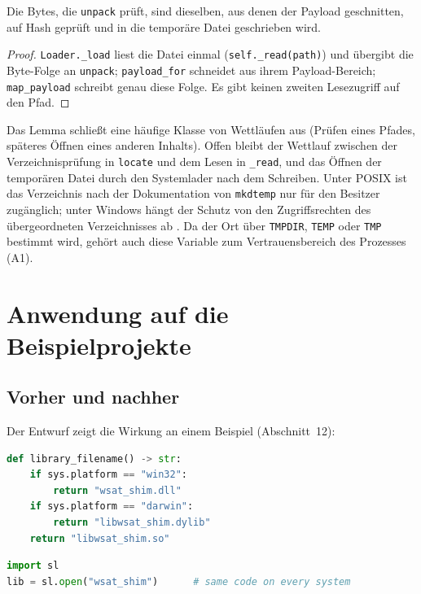 \begin{lemma}
	\label{lem:einmal}
	Die Bytes, die \texttt{unpack} prüft, sind dieselben, aus denen der Payload geschnitten, auf Hash geprüft und in die temporäre Datei geschrieben wird.
\end{lemma}

\begin{proof}
	\texttt{Loader.\_load} liest die Datei einmal (\texttt{self.\_read(path)}) und übergibt die Byte-Folge an \texttt{unpack}; \texttt{payload\_for} schneidet aus ihrem Payload-Bereich; \texttt{map\_payload} schreibt genau diese Folge. Es gibt keinen zweiten Lesezugriff auf den Pfad.
\end{proof}

Das Lemma schließt eine häufige Klasse von Wettläufen aus (Prüfen eines Pfades, späteres Öffnen eines anderen Inhalts). Offen bleibt der Wettlauf zwischen der Verzeichnisprüfung in \texttt{locate} und dem Lesen in \texttt{\_read}, und das Öffnen der temporären Datei durch den Systemlader nach dem Schreiben. Unter POSIX ist das Verzeichnis nach der Dokumentation von \texttt{mkdtemp} nur für den Besitzer zugänglich; unter Windows hängt der Schutz von den Zugriffsrechten des übergeordneten Verzeichnisses ab . Da der Ort über \texttt{TMPDIR}, \texttt{TEMP} oder \texttt{TMP} bestimmt wird, gehört auch diese Variable zum Vertrauensbereich des Prozesses (A1).

\chapter{Anwendung auf die Beispielprojekte}
\label{chap:anwendung}

\section{Vorher und nachher}

Der Entwurf zeigt die Wirkung an einem Beispiel (Abschnitt~12):

\begin{lstlisting}[language=Python, caption={Vorher: plattformabhängiger Dateiname (nach \texttt{proposal.md}, Abschnitt~12).}, label={lst:vorher}]
def library_filename() -> str:
    if sys.platform == "win32":
        return "wsat_shim.dll"
    if sys.platform == "darwin":
        return "libwsat_shim.dylib"
    return "libwsat_shim.so"
\end{lstlisting}

\begin{lstlisting}[language=Python, caption={Nachher: dieselbe Zeile auf jedem System.}, label={lst:nachher}]
import sl
lib = sl.open("wsat_shim")      # same code on every system
\end{lstlisting}

